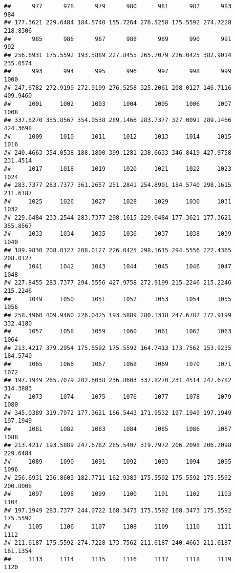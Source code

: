 \documentclass[
]{article}
\begin{document}
\begin{verbatim}
##      977      978      979      980      981      982      983      984 
## 177.3621 229.6484 184.5740 155.7264 276.5258 175.5592 274.7228 218.8306 
##      985      986      987      988      989      990      991      992 
## 256.6931 175.5592 193.5889 227.8455 265.7079 226.0425 382.9014 235.0574 
##      993      994      995      996      997      998      999     1000 
## 247.6782 272.9199 272.9199 276.5258 325.2061 208.0127 146.7116 409.9460 
##     1001     1002     1003     1004     1005     1006     1007     1008 
## 337.8270 355.8567 354.0538 289.1466 283.7377 327.0091 289.1466 424.3698 
##     1009     1010     1011     1012     1013     1014     1015     1016 
## 240.4663 354.0538 188.1800 399.1281 238.6633 346.8419 427.9758 231.4514 
##     1017     1018     1019     1020     1021     1022     1023     1024 
## 283.7377 283.7377 361.2657 251.2841 254.8901 184.5740 298.1615 211.6187 
##     1025     1026     1027     1028     1029     1030     1031     1032 
## 229.6484 233.2544 283.7377 298.1615 229.6484 177.3621 177.3621 355.8567 
##     1033     1034     1035     1036     1037     1038     1039     1040 
## 189.9830 208.0127 208.0127 226.0425 298.1615 294.5556 222.4365 208.0127 
##     1041     1042     1043     1044     1045     1046     1047     1048 
## 227.8455 283.7377 294.5556 427.9758 272.9199 215.2246 215.2246 215.2246 
##     1049     1050     1051     1052     1053     1054     1055     1056 
## 258.4960 409.9460 226.0425 193.5889 280.1318 247.6782 272.9199 332.4180 
##     1057     1058     1059     1060     1061     1062     1063     1064 
## 213.4217 379.2954 175.5592 175.5592 164.7413 173.7562 153.9235 184.5740 
##     1065     1066     1067     1068     1069     1070     1071     1072 
## 197.1949 265.7079 202.6038 236.8603 337.8270 231.4514 247.6782 314.3883 
##     1073     1074     1075     1076     1077     1078     1079     1080 
## 345.0389 319.7972 177.3621 166.5443 171.9532 197.1949 197.1949 197.1949 
##     1081     1082     1083     1084     1085     1086     1087     1088 
## 213.4217 193.5889 247.6782 285.5407 319.7972 206.2098 206.2098 229.6484 
##     1089     1090     1091     1092     1093     1094     1095     1096 
## 256.6931 236.8603 182.7711 162.9383 175.5592 175.5592 175.5592 200.8008 
##     1097     1098     1099     1100     1101     1102     1103     1104 
## 197.1949 283.7377 244.0722 168.3473 175.5592 168.3473 175.5592 175.5592 
##     1105     1106     1107     1108     1109     1110     1111     1112 
## 211.6187 175.5592 274.7228 173.7562 211.6187 240.4663 211.6187 161.1354 
##     1113     1114     1115     1116     1117     1118     1119     1120 

\end{verbatim}
\end{document}
